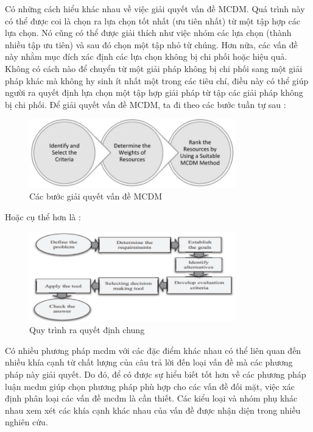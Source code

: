 Có những cách hiểu khác nhau về việc giải quyết vấn đề MCDM. Quá trình này có thể được coi là chọn ra lựa chọn tốt nhất (ưu tiên nhất) từ một tập hợp các lựa chọn. Nó cũng có thể được giải thích như việc nhóm các lựa chọn (thành nhiều tập ưu tiên) và sau đó chọn một tập nhỏ từ chúng. Hơn nữa, các vấn đề này nhằm mục đích xác định các lựa chọn không bị chi phối hoặc hiệu quả. Không có cách nào để chuyển từ một giải pháp không bị chi phối sang một giải pháp khác mà không hy sinh ít nhất một trong các tiêu chí, điều này có thể giúp người ra quyết định lựa chọn một tập hợp giải pháp từ tập các giải pháp không bị chi phối. Để giải quyết vấn đề MCDM, ta đi theo các bước tuần tự sau : 
\begin{figure}[H]
    \centering
    \includegraphics[width=0.8\textwidth]{images/chap2/MCDMstep.png}
    \vspace{0.5cm}
    \caption{Các bước giải quyết vấn đề MCDM}
\end{figure}

Hoặc cụ thể hơn là \cite{davood}:

\begin{figure}[H]
    \centering
    \includegraphics[width=0.8\textwidth, height=0.35\textheight]{images/chap2/MCDMdiagram.png}
    \vspace{0.5cm}
    \caption{Quy trình ra quyết định chung}
\end{figure}

Có nhiều phương pháp \acrshort{mcdm} với các đặc điểm khác nhau có thể liên quan đến nhiều khía cạnh từ chất lượng của câu trả lời đến loại vấn đề mà các phương pháp này giải quyết. Do đó, để có được sự hiểu biết tốt hơn về các phương pháp luận \acrshort{mcdm} giúp chọn phương pháp phù hợp cho các vấn đề đối mặt, việc xác định phân loại các vấn đề \acrshort{mcdm} là cần thiết. Các kiểu loại và nhóm phụ khác nhau xem xét các khía cạnh khác nhau của vấn đề được nhận diện trong nhiều nghiên cứu. 

